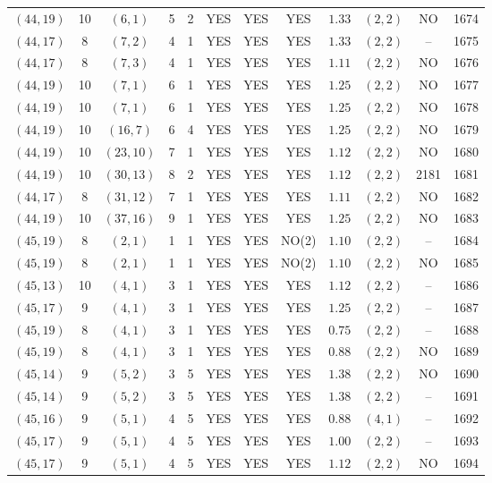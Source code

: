 \begin{longtable}{|c|c|c|c|c|c|c|c|c|c|c|c|}
$(44,19)$ & 10 & $(6,1)$ & 5 & 2 & YES & YES & YES & $1.33$ & $(2,2)$ & NO & 1674\\
$(44,17)$ & 8 & $(7,2)$ & 4 & 1 & YES & YES & YES & $1.33$ & $(2,2)$ & -- & 1675\\
$(44,17)$ & 8 & $(7,3)$ & 4 & 1 & YES & YES & YES & $1.11$ & $(2,2)$ & NO & 1676\\
$(44,19)$ & 10 & $(7,1)$ & 6 & 1 & YES & YES & YES & $1.25$ & $(2,2)$ & NO & 1677\\
$(44,19)$ & 10 & $(7,1)$ & 6 & 1 & YES & YES & YES & $1.25$ & $(2,2)$ & NO & 1678\\
$(44,19)$ & 10 & $(16,7)$ & 6 & 4 & YES & YES & YES & $1.25$ & $(2,2)$ & NO & 1679\\
$(44,19)$ & 10 & $(23,10)$ & 7 & 1 & YES & YES & YES & $1.12$ & $(2,2)$ & NO & 1680\\
$(44,19)$ & 10 & $(30,13)$ & 8 & 2 & YES & YES & YES & $1.12$ & $(2,2)$ & 2181 & 1681\\
$(44,17)$ & 8 & $(31,12)$ & 7 & 1 & YES & YES & YES & $1.11$ & $(2,2)$ & NO & 1682\\
$(44,19)$ & 10 & $(37,16)$ & 9 & 1 & YES & YES & YES & $1.25$ & $(2,2)$ & NO & 1683\\
$(45,19)$ & 8 & $(2,1)$ & 1 & 1 & YES & YES & NO(2) & $1.10$ & $(2,2)$ & -- & 1684\\
$(45,19)$ & 8 & $(2,1)$ & 1 & 1 & YES & YES & NO(2) & $1.10$ & $(2,2)$ & NO & 1685\\
$(45,13)$ & 10 & $(4,1)$ & 3 & 1 & YES & YES & YES & $1.12$ & $(2,2)$ & -- & 1686\\
$(45,17)$ & 9 & $(4,1)$ & 3 & 1 & YES & YES & YES & $1.25$ & $(2,2)$ & -- & 1687\\
$(45,19)$ & 8 & $(4,1)$ & 3 & 1 & YES & YES & YES & $0.75$ & $(2,2)$ & -- & 1688\\
$(45,19)$ & 8 & $(4,1)$ & 3 & 1 & YES & YES & YES & $0.88$ & $(2,2)$ & NO & 1689\\
$(45,14)$ & 9 & $(5,2)$ & 3 & 5 & YES & YES & YES & $1.38$ & $(2,2)$ & NO & 1690\\
$(45,14)$ & 9 & $(5,2)$ & 3 & 5 & YES & YES & YES & $1.38$ & $(2,2)$ & -- & 1691\\
$(45,16)$ & 9 & $(5,1)$ & 4 & 5 & YES & YES & YES & $0.88$ & $(4,1)$ & -- & 1692\\
$(45,17)$ & 9 & $(5,1)$ & 4 & 5 & YES & YES & YES & $1.00$ & $(2,2)$ & -- & 1693\\
$(45,17)$ & 9 & $(5,1)$ & 4 & 5 & YES & YES & YES & $1.12$ & $(2,2)$ & NO & 1694\\

\end{longtable}

